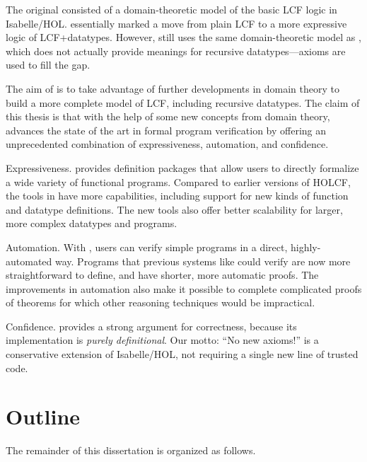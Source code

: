 The original  consisted of a domain-theoretic model of the basic LCF logic in Isabelle/HOL.  essentially marked a move from plain LCF to a more expressive logic of LCF+datatypes. However,  still uses the same domain-theoretic model as , which does not actually provide meanings for recursive datatypes---axioms are used to fill the gap.

The aim of  is to take advantage of further developments in domain theory to build a more complete model of LCF, including recursive datatypes. The claim of this thesis is that with the help of some new concepts from domain theory,  advances the state of the art in formal program verification by offering an unprecedented combination of expressiveness, automation, and confidence.

\begin{description*}

\item[Expressiveness.]  provides definition packages that allow users to directly formalize a wide variety of functional programs. Compared to earlier versions of HOLCF, the tools in  have more capabilities, including support for new kinds of function and datatype definitions. The new tools also offer better scalability for larger, more complex datatypes and programs.

\item[Automation.] With , users can verify simple programs in a direct, highly-automated way. Programs that previous systems like  could verify are now more straightforward to define, and have shorter, more automatic proofs. The improvements in automation also make it possible to complete complicated proofs of theorems for which other reasoning techniques would be impractical.

\item[Confidence.]  provides a strong argument for correctness, because its implementation is \emph{purely definitional}. Our motto: ``No new axioms!''  is a conservative extension of Isabelle/HOL, not requiring a single new line of trusted code.

\end{description*}

\section{Outline}

The remainder of this dissertation is organized as follows.

